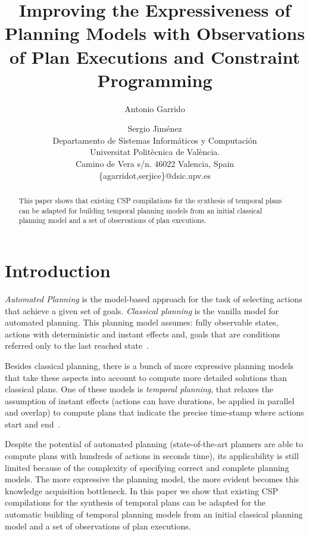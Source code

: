 \documentclass[letterpaper]{article} %
\begin{document}
\title{Improving the Expressiveness of Planning Models with Observations of Plan Executions and Constraint Programming}

\author{Antonio Garrido\and Sergio Jim\'enez\\
{\small Departamento de Sistemas Inform\'aticos y Computaci\'on}\\
{\small Universitat Polit\`ecnica de Val\`encia.}\\
{\small Camino de Vera s/n. 46022 Valencia, Spain}\\
{\small \{agarridot,serjice\}@dsic.upv.es}}



\maketitle
\begin{abstract}
This paper shows that existing CSP compilations for the synthesis of temporal plans can be adapted for building temporal planning models from an initial classical planning model and a set of observations of plan executions.
\end{abstract}


\section{Introduction}
\label{sec:introduction}
{\em Automated Planning} is the model-based approach for the task of selecting actions that achieve a given set of goals. {\em Classical planning} is the vanilla model for automated planning. This planning model assumes: fully observable states, actions with deterministic and instant effects and, goals that are conditions referred only to the last reached state~\cite{geffner2013concise}.

Besides classical planning, there is a bunch of more expressive planning models that take these aspects into account to compute more detailed solutions than classical plans. One of these models is {\em temporal planning}, that relaxes the assumption of instant effects (actions can have durations, be applied in parallel and overlap) to compute plans that indicate the precise time-stamp where actions start and end~\cite{ghallab2004automated}.

Despite the potential of automated planning (state-of-the-art planners are able to compute plans with hundreds of actions in seconds time), its applicability is still limited because of the complexity of specifying correct and complete planning models. The more expressive the planning model, the more evident becomes this knowledge acquisition bottleneck. In this paper we show that existing CSP compilations for the synthesis of temporal plans can be adapted for the automatic building of temporal planning models from an initial classical planning model and a set of observations of plan executions.
\end{document}
